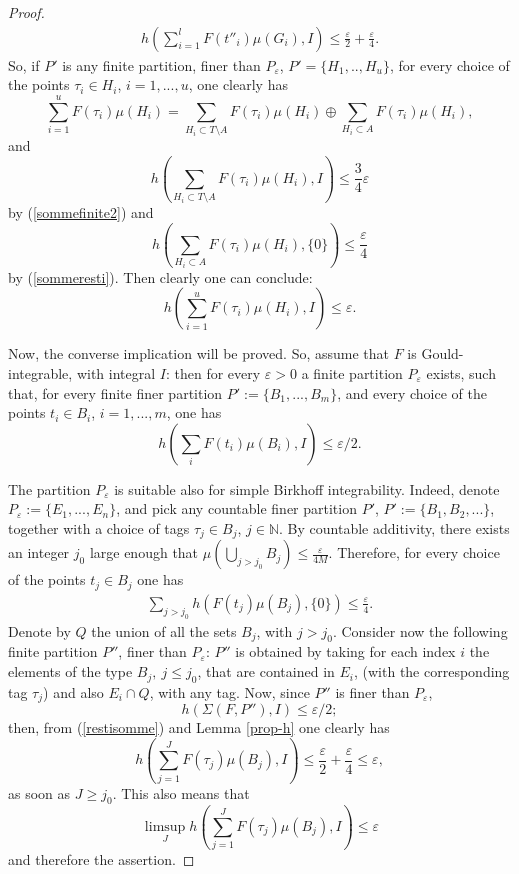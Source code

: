 \documentclass[11pt,a4paper,twoside]{amsart}
\begin{document}
\begin{proof}
\begin{eqnarray}\label{sommefinite2}
h(\sum_{i=1}^l F(t''_i)\mu(G_i),I)\leq \frac{\varepsilon}{2} + \frac{\varepsilon}{4}.
\end{eqnarray}
So, if $P'$ is any finite partition, finer than $P_{\varepsilon}$, $P'=\{H_1,..,H_u\}$, for every choice of the points $\tau_i\in H_i$, $i=1,...,u$, one clearly has
$$\sum_{i=1}^uF(\tau_i)\mu(H_i)=\sum_{H_i\subset T\setminus A} F(\tau_i)\mu(H_i) \oplus
\sum_{H_i\subset A}F(\tau_i)\mu(H_i),$$
and
$$h(\sum_{H_i\subset T\setminus A}F(\tau_i)\mu(H_i),I)\leq  \frac{3}{4}{\varepsilon}$$
by (\ref{sommefinite2})
and
$$h(\sum_{H_i\subset A}F(\tau_i)\mu(H_i),\{0\})\leq \frac{\varepsilon}{4}$$
by (\ref{sommeresti}). Then clearly one can conclude:
$$h(\sum_{i=1}^uF(\tau_i)\mu(H_i),I)\leq {\varepsilon}. $$

Now, the converse implication will be proved. So, assume that $F$ is Gould-integrable, with integral $I$: then for every ${\varepsilon}>0$ a finite partition $P_{\varepsilon}$ exists, such that, for every finite finer partition $P':=\{B_1,...,B_m\}$, and every choice of the points $t_i\in B_i$, $i=1,...,m$, one has
$$h(\sum_i F(t_i)\mu(B_i),I)\leq {\varepsilon}/2.$$

The partition $P_{\varepsilon}$ is suitable also for simple Birkhoff integrability. Indeed, denote $P_{\varepsilon}:=\{E_1,...,E_n\}$, and pick any countable finer partition $P'$, $P':=\{B_1,B_2,...\}$, together with a choice of tags $\tau_j\in B_j$, $j\in \mathbb{N}$. By countable additivity, there exists an integer $j_0$ large enough that $\mu(\bigcup_{j>j_0}B_j)\leq \frac{\varepsilon}{4M}$.
Therefore, for every choice of the points $t_j\in B_j$ one has
\begin{eqnarray}\label{restisomme}
\sum_{j>j_0}h(F(t_j)\mu(B_j),\{0\})\leq \frac{\varepsilon}{4}.
\end{eqnarray}
Denote by $Q$ the union of all the sets $B_j$, with $j>j_0$.
Consider now the following finite partition $P''$, finer than $P_{\varepsilon}$: $P''$ is  obtained by taking for each index $i$ the elements of the type $B_j,\ j\leq j_0$, that are contained in $E_i$, (with the corresponding  tag $\tau_j$) and also $E_i\cap Q$, with any tag. Now, since $P''$ is finer than $P_{\varepsilon}$,
$$h(\Sigma(F,P''),I)\leq {\varepsilon}/2;$$
then, from (\ref{restisomme}) and Lemma \ref{prop-h} one clearly has
$$h(\sum_{j=1}^JF(\tau_j)\mu(B_j),I)\leq \frac{\varepsilon}{2}+\frac{\varepsilon}{4}\leq {\varepsilon},$$
as soon as $J\geq j_0$. This also means that
$$\limsup_Jh(\sum_{j=1}^JF(\tau_j)\mu(B_j),I)\leq {\varepsilon}$$
and therefore the assertion.
\end{proof} 
\end{document}

